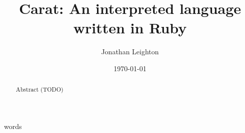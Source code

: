 \documentclass[10pt,a4paper]{article}
\title{Carat: An interpreted language written in Ruby}
\author{Jonathan Leighton}
\date{\today}
\numberwithin{figure}{section}
\begin{document}
	\maketitle
	
	 words
	
	\begin{abstract}
	Abstract (TODO)
	\end{abstract}
	
	\tableofcontents
	
	\setlength{\parindent}{0pt}
  \setlength{\parskip}{2ex}
	
	
	
	
	
	\printglossary
\end{document}
